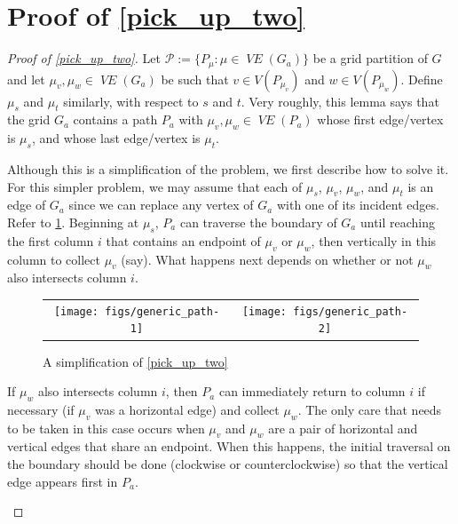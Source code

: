 \documentclass{patmorin}
\DeclareMathOperator{\VE}{\mathit{VE}}
\begin{document}




\appendix
\section{Proof of \cref{pick_up_two}}
\label{pick_up_two_proof}


\begin{proof}[Proof of \cref{pick_up_two}]
  Let $\mathcal{P}:=\{P_\mu:\mu\in \VE(G_a)\}$ be a grid partition of $G$ and let $\mu_v,\mu_w\in \VE(G_a)$ be such that $v\in V(P_{\mu_v})$ and $w\in V(P_{\mu_w})$.  Define $\mu_s$ and $\mu_t$ similarly, with respect to $s$ and $t$.  Very roughly, this lemma says that the grid $G_a$ contains a path $P_a$ with $\mu_v,\mu_w\in\VE(P_a)$ whose first edge/vertex is $\mu_s$, and whose last edge/vertex is $\mu_t$.

  Although this is a simplification of the problem, we first describe how to solve it.  For this simpler problem, we may assume that each of $\mu_s$, $\mu_v$, $\mu_w$, and $\mu_t$ is an edge of $G_a$ since we can replace any vertex of $G_a$ with one of its incident edges. Refer to \cref{generic_path}. Beginning at $\mu_s$, $P_a$ can traverse the boundary of $G_a$ until reaching the first column $i$ that contains an endpoint of $\mu_v$ or $\mu_w$, then vertically in this column to collect $\mu_v$ (say). What happens next depends on whether or not $\mu_w$ also intersects column $i$.
  \begin{figure}[htbp]
    \begin{center}
      \begin{tabular}{cc}
        \texttt{[image: figs/generic\_path-1]} &
        \texttt{[image: figs/generic\_path-2]}
      \end{tabular}
    \end{center}
    \caption{A simplification of \cref{pick_up_two}}
    \label{generic_path}
  \end{figure}
  \begin{compactitem}
    \item If $\mu_w$ also intersects column $i$, then $P_a$ can immediately return to column $i$ if necessary (if $\mu_v$ was a horizontal edge) and collect $\mu_w$. The only care that needs to be taken in this case occurs when $\mu_v$ and $\mu_w$ are a pair of horizontal and vertical edges that share an endpoint.  When this happens, the initial traversal on the boundary should be done (clockwise or counterclockwise) so that the vertical edge appears first in $P_a$.


\end{compactitem}
\end{proof}
\end{document}
